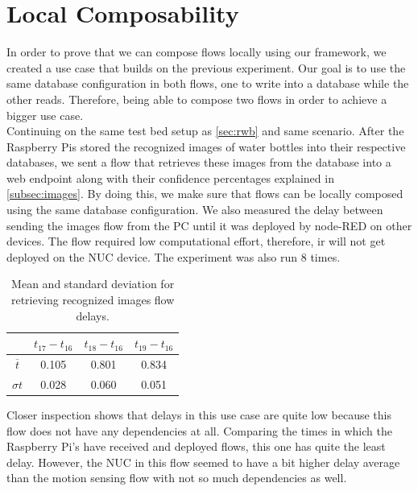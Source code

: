 \section{Local Composability}
In order to prove that we can compose flows locally using our framework, we created a use case that builds on the  previous experiment. Our goal is to use the same database configuration in both flows, one to write into a database while the other reads. Therefore, being able to compose two flows in order to achieve a bigger use case.\\

 \noindent Continuing on the same test bed setup as \ref{sec:rwb} and same scenario.  After the Raspberry Pis stored the recognized images of water bottles into their respective  databases, we sent a flow that retrieves these images from the database into a web endpoint along with their confidence percentages explained in \ref{subsec:images}. By doing this, we make sure that flows can be locally composed using the same database configuration. We also measured the delay between sending the images flow from the PC until it was deployed by node-RED on other devices. The flow required low computational effort, therefore, ir will not get deployed on the NUC device. The experiment was also run 8 times.

\begin{table}[H]
\centering
\begin{tabular}{ c | c | c| c }	\toprule
&$t_{17} - t_{16}$  & $t_{18} - t_{16}$  & $t_{19}-t_{16}$ \\ \midrule
$ \overline{t} $&	0.105&	0.801&	0.834\\
$ \sigma t $&	0.028&	0.060&	0.051\\
\end{tabular}
\caption{Mean and standard deviation for retrieving recognized images flow delays.}
\label{table:images}
\end{table}

\noindent Closer inspection shows that  delays in this use case are quite low because this flow does not have any dependencies at all. Comparing the times in which the Raspberry Pi's have received and deployed flows, this one  has quite the least delay. However, the NUC in this flow seemed to have a bit higher delay average than the motion sensing flow with not so much dependencies as well.


